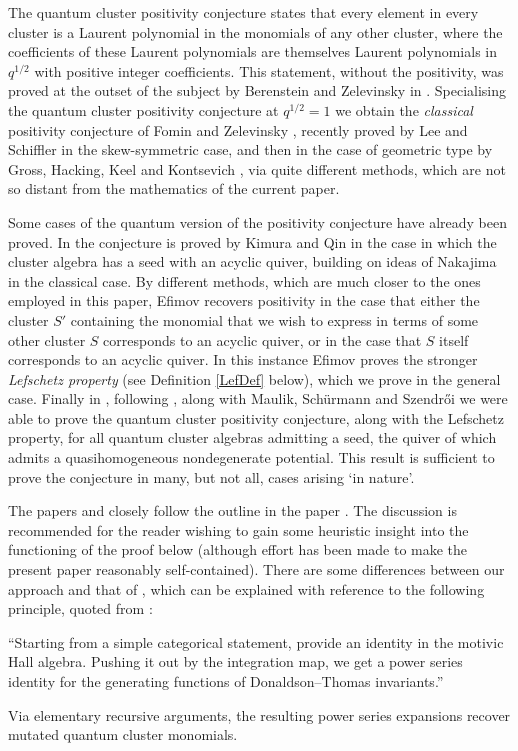 \documentclass[a4paper,10pt]{amsart}
\begin{document}
The quantum cluster positivity conjecture states that every element in every cluster is a Laurent polynomial in the monomials of any other cluster, where the coefficients of these Laurent polynomials are themselves Laurent polynomials in $q^{1/2}$ with positive integer coefficients.  This statement, without the positivity, was proved at the outset of the subject by Berenstein and Zelevinsky in \cite{BZ05}.  Specialising the quantum cluster positivity conjecture at $q^{1/2}=1$ we obtain the \textit{classical} positivity conjecture of Fomin and Zelevinsky \cite{FZ02}, recently proved by Lee and Schiffler \cite{LS15} in the skew-symmetric case, and then in the case of geometric type by Gross, Hacking, Keel and Kontsevich \cite{GHKK14}, via quite different methods, which are not so distant from the mathematics of the current paper.

Some cases of the quantum version of the positivity conjecture have already been proved.  In \cite[Cor.3.3.10]{KQ14} the conjecture is proved by Kimura and Qin in the case in which the cluster algebra has a seed with an acyclic quiver, building on ideas of Nakajima \cite{Na11} in the classical case.  By different methods, which are much closer to the ones employed in this paper, Efimov \cite{Efi11} recovers positivity in the case that either the cluster $S'$ containing the monomial that we wish to express in terms of some other cluster $S$ corresponds to an acyclic quiver, or in the case that $S$ itself corresponds to an acyclic quiver.  In this instance Efimov proves the stronger \textit{Lefschetz property} (see Definition \ref{LefDef} below), which we prove in the general case.  Finally in \cite{DMSS13}, following \cite{Efi11}, along with Maulik, Sch\"urmann and Szendr\H{o}i  we were able to prove the quantum cluster positivity conjecture, along with the Lefschetz property, for all quantum cluster algebras admitting a seed, the quiver of which admits a quasihomogeneous nondegenerate potential.  This result is sufficient to prove the conjecture in many, but not all, cases arising `in nature'.

The papers \cite{Efi11} and \cite{DMSS13} closely follow the outline in the paper \cite{Na13}.  The discussion \cite[Sec.7]{Na13} is recommended for the reader wishing to gain some heuristic insight into the functioning of the proof below (although effort has been made to make the present paper reasonably self-contained).  There are some differences between our approach and that of \cite{Na13}, which can be explained with reference to the following principle, quoted from \cite{Na13}:
\begin{center}
``Starting from a simple categorical statement, provide an identity in the motivic Hall algebra. Pushing it out by the integration map, we get a power series identity for the generating functions of Donaldson--Thomas invariants.''
\end{center}
Via elementary recursive arguments, the resulting power series expansions recover mutated quantum cluster monomials.  
\end{document}
